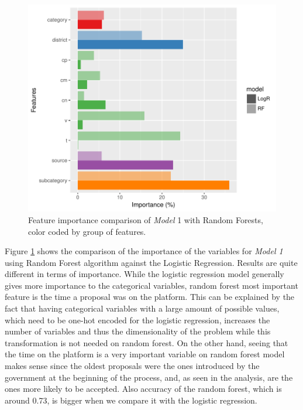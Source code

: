 \begin{figure}[t]
\centering
\includegraphics[width=\textwidth]{Figures/logr_vs_rf.pdf}
\caption{Feature importance comparison of \emph{Model} 1 with Random Forests, color coded by group of features.}
\label{importance_rf}
\end{figure}

Figure \ref{importance_rf} shows the comparison of the importance of the variables for \emph{Model 1} using Random Forest algorithm against the Logistic Regression. Results are quite different in terms of importance. While the logistic regression model generally gives more importance to the categorical variables, random forest most important feature is the time a proposal was on the platform. This can be explained by the fact that having categorical variables with a large amount of possible values, which need to be one-hot encoded for the logistic regression, increases the number of variables and thus the dimensionality of the problem while this transformation is not needed on random forest. On the other hand, seeing that the time on the platform is a very important variable on random forest model makes sense since the oldest proposals were the ones introduced by the government at the beginning of the process, and, as seen in the analysis, are the ones more likely to be accepted. Also accuracy of the random forest, which is around 0.73, is bigger when we compare it with the logistic regression. 

